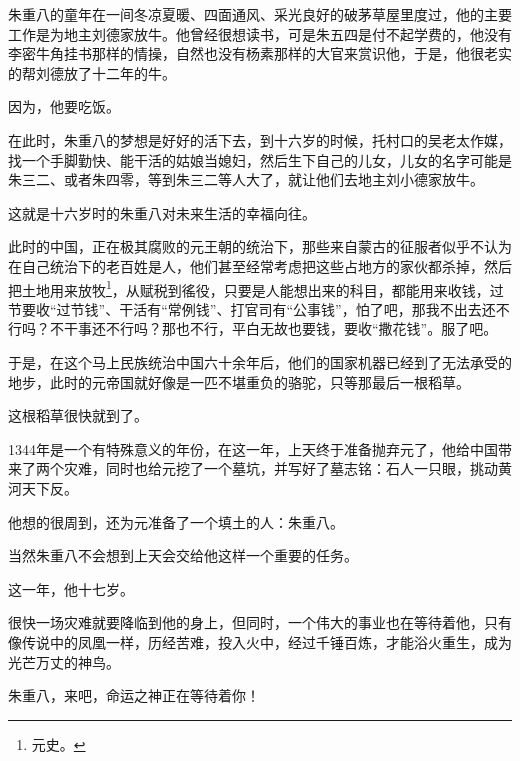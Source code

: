 \begin{multicols}{\theparacolNo}
		朱重八的童年在一间冬凉夏暖、四面通风、采光良好的破茅草屋里度过，他的主要工作是为地主刘德家放牛。他曾经很想读书，可是朱五四是付不起学费的，他没有李密牛角挂书那样的情操，自然也没有杨素那样的大官来赏识他，于是，他很老实的帮刘德放了十二年的牛。

		因为，他要吃饭。

		在此时，朱重八的梦想是好好的活下去，到十六岁的时候，托村口的吴老太作媒，找一个手脚勤快、能干活的姑娘当媳妇，然后生下自己的儿女，儿女的名字可能是朱三二、或者朱四零，等到朱三二等人大了，就让他们去地主刘小德家放牛。

		这就是十六岁时的朱重八对未来生活的幸福向往。

		此时的中国，正在极其腐败的元王朝的统治下，那些来自蒙古的征服者似乎不认为在自己统治下的老百姓是人，他们甚至经常考虑把这些占地方的家伙都杀掉，然后把土地用来放牧\footnote{元史。}，从赋税到徭役，只要是人能想出来的科目，都能用来收钱，过节要收“过节钱”、干活有“常例钱”、打官司有“公事钱”，怕了吧，那我不出去还不行吗？不干事还不行吗？那也不行，平白无故也要钱，要收“撒花钱”。服了吧。

		于是，在这个马上民族统治中国六十余年后，他们的国家机器已经到了无法承受的地步，此时的元帝国就好像是一匹不堪重负的骆驼，只等那最后一根稻草。

		这根稻草很快就到了。

		1344年是一个有特殊意义的年份，在这一年，上天终于准备抛弃元了，他给中国带来了两个灾难，同时也给元挖了一个墓坑，并写好了墓志铭：石人一只眼，挑动黄河天下反。

		他想的很周到，还为元准备了一个填土的人：朱重八。

		当然朱重八不会想到上天会交给他这样一个重要的任务。

		这一年，他十七岁。

		很快一场灾难就要降临到他的身上，但同时，一个伟大的事业也在等待着他，只有像传说中的凤凰一样，历经苦难，投入火中，经过千锤百炼，才能浴火重生，成为光芒万丈的神鸟。

		朱重八，来吧，命运之神正在等待着你！
		\ifnum{}
	\end{multicols}
\fi
\newpage

